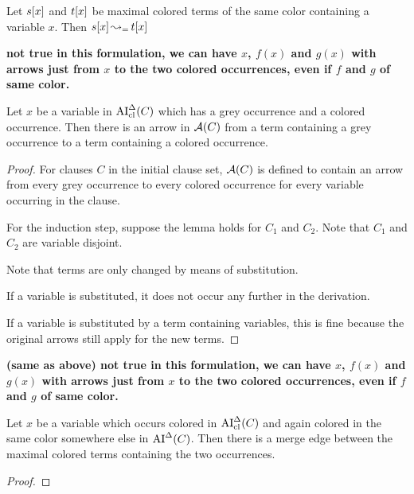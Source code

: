 \documentclass[,%
	paper=a4,%
	DIV11, %
	twoside=false,%
	liststotoc,
	bibtotoc,
	draft=false,%
	numbers=noendperiod
]{scrartcl}
\begin{document}
\begin{clemma}
	\label{wrong:same_color}
	Let $s[x]$ and $t[x]$ be maximal colored terms of the same color containing a variable $x$. 
	Then $s[x] \operatorname{\leadsto_=} t[x]$
\end{clemma}


\begin{lemma}
	\label{DEPR:lemma:arrow_from_grey_to_colored}
	{

		\LARGE\bfseries\color{red}
		not true in this formulation, we can have $x$, $f(x)$ and $g(x)$ with arrows just from $x$ to the two colored occurrences, even if $f$ and $g$ of same color.


	}
	Let $x$ be a variable in $\operatorname{AI}_\mathrm{cl}^\Delta(C)$ which has a grey occurrence and a colored occurrence. 
	Then there is an arrow in $\operatorname{\mathcal{A}}(C)$ from a term containing a grey occurrence to a term containing a colored occurrence.
\end{lemma}
\begin{proof}
	For clauses $C$ in the initial clause set, $\operatorname{\mathcal{A}}(C)$ is defined to contain an arrow from every grey occurrence to every colored occurrence for every variable occurring in the clause.  

	For the induction step, suppose the lemma holds for $C_1$ and $C_2$. 
	Note that $C_1$ and $C_2$ are variable disjoint.

	Note that terms are only changed by means of substitution. 

	If a variable is substituted, it does not occur any further in the derivation. 

	If a variable is substituted by a term containing variables, this is fine because the original arrows still apply for the new terms. 
\end{proof}

\begin{lemma}
	{

		\LARGE\bfseries\color{red} (same as above)
		not true in this formulation, we can have $x$, $f(x)$ and $g(x)$ with arrows just from $x$ to the two colored occurrences, even if $f$ and $g$ of same color.


	}
	\label{DEPR:lemma:arrow_from_colored_to_colored}
	Let $x$ be a variable which occurs colored in $\operatorname{AI}_\mathrm{cl}^\Delta(C)$ and again colored in the same color somewhere else in $\operatorname{AI}^\Delta(C)$.
	Then there is a merge edge between the maximal colored terms containing the two occurrences.
\end{lemma}
\begin{proof}
	\mytodo{}
\end{proof}
\end{document}
